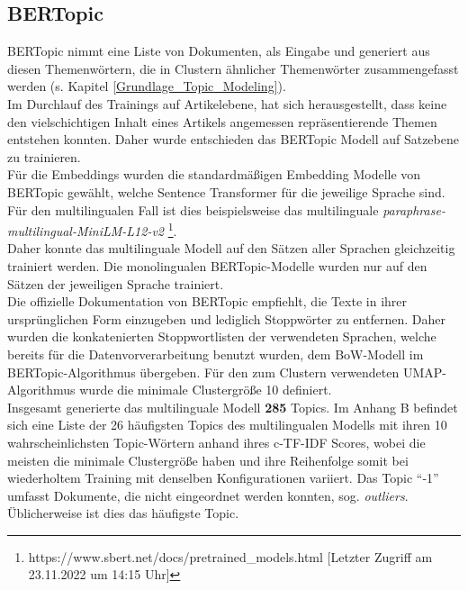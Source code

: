 \documentclass[ngerman]{ttlab-qualify}
\begin{document}
\subsection{BERTopic} \label{bertopic_}
BERTopic nimmt eine Liste von Dokumenten, als Eingabe und generiert aus diesen Themenwörtern, die in Clustern ähnlicher Themenwörter zusammengefasst werden (s. Kapitel \ref{Grundlage_Topic_Modeling}).\\
Im Durchlauf des Trainings auf Artikelebene, hat sich herausgestellt, dass keine den vielschichtigen Inhalt eines Artikels angemessen repräsentierende Themen entstehen konnten. Daher wurde entschieden das BERTopic Modell auf Satzebene zu trainieren.\\ 
Für die Embeddings wurden die standardmäßigen Embedding Modelle von BERTopic gewählt, welche Sentence Transformer \parencite{reimers-2019-sentence-bert} für die jeweilige Sprache sind. Für den multilingualen Fall ist dies beispielsweise das multilinguale \textit{paraphrase-multilingual-MiniLM-L12-v2} \footnote{https://www.sbert.net/docs/pretrained\_models.html [Letzter Zugriff am 23.11.2022 um 14:15 Uhr]}.\\
Daher konnte das multilinguale Modell auf den Sätzen aller Sprachen gleichzeitig trainiert werden. Die monolingualen BERTopic-Modelle wurden nur auf den Sätzen der jeweiligen Sprache trainiert.\\ 
Die offizielle Dokumentation von BERTopic empfiehlt, die Texte in ihrer ursprünglichen Form einzugeben und lediglich Stoppwörter zu entfernen. Daher wurden die konkatenierten Stoppwortlisten der verwendeten Sprachen, welche bereits für die Datenvorverarbeitung benutzt wurden, dem BoW-Modell im BERTopic-Algorithmus übergeben. Für den zum Clustern verwendeten UMAP-Algorithmus wurde die minimale Clustergröße 10 definiert.\\
Insgesamt generierte das multilinguale Modell \textbf{285} Topics. Im Anhang B befindet sich eine Liste der 26 häufigsten Topics des multilingualen Modells mit ihren 10 wahrscheinlichsten Topic-Wörtern anhand ihres c-TF-IDF Scores, wobei die meisten die minimale Clustergröße haben und ihre Reihenfolge somit bei wiederholtem Training mit denselben Konfigurationen variiert. Das Topic "`-1"' umfasst Dokumente, die nicht eingeordnet werden konnten, sog. \textit{outliers}. Üblicherweise ist dies das häufigste Topic.
\end{document}
